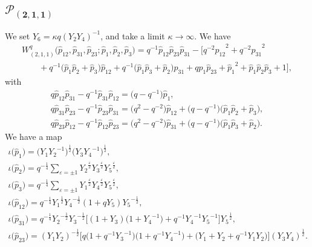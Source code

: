 \documentclass[pdftex]{sigma}
\numberwithin{equation}{section}
\begin{document}
\subsection[$\mathcal{P}_{(2,1,1)}$]{$\boldsymbol{\mathcal{P}_{(2,1,1)}}$}
We set $Y_6 = \kappa q ( Y_2 Y_4)^{-1}$, and take a limit $\kappa \to \infty$. We have
\begin{gather*}
 W^q_{(2,1,1)}\big(\hat{p}_{12}, \hat{p}_{31}, \hat{p}_{23} ; \hat{p}_1, \hat{p}_2, \hat{p}_3\big) = q^{-1} \hat{p}_{12} \hat{p}_{23} \hat{p}_{31} - \bigl[ q^{-2} {\hat{p}_{12}}^{2} + q^{-2} {\hat{p}_{31}}^{2} \\
 \qquad {} + q^{-1} \big( \hat{p}_1 \hat{p}_2 + \hat{p}_3 \big) \hat{p}_{12} + q^{-1} \big( \hat{p}_1 \hat{p}_3 + \hat{p}_2 \big) \hat{p}_{31} + q \hat{p}_1 \hat{p}_{23} + {\hat{p}_1}^{2} +
 \hat{p}_1 \hat{p}_2 \hat{p}_3 + 1 \bigr],
\end{gather*}
with
\begin{gather*}
 q \hat{p}_{12} \hat{p}_{31} -q^{-1} \hat{p}_{31} \hat{p}_{12} = \big( q - q^{-1} \big) \hat{p}_1 , \\
 q \hat{p}_{31} \hat{p}_{23} -q^{-1} \hat{p}_{23} \hat{p}_{31} = \big(q^2 - q^{-2}\big) \hat{p}_{12} + \big( q - q^{-1} \big) \big( \hat{p}_1 \hat{p}_2 + \hat{p}_3 \big), \\
 q \hat{p}_{23} \hat{p}_{12} -q^{-1} \hat{p}_{12} \hat{p}_{23} = \big( q^2 - q^{-2} \big) \hat{p}_{31} + \big( q - q^{-1} \big) \big( \hat{p}_1 \hat{p}_3 + \hat{p}_2 \big) .
\end{gather*}
We have a map
\begin{gather}
 \iota \big(\hat{p}_1\big) = \big( Y_1 {Y_2}^{-1} \big)^{\frac{1}{2}} \big( Y_3 {Y_4}^{-1} \big)^{\frac{1}{2}},\nonumber \\
 \iota\big(\hat{p}_2\big) = q^{-\frac{1}{4}} \sum_{\varepsilon=\pm 1} {Y_2}^{\frac{\varepsilon}{2}} {Y_3}^{\frac{\varepsilon}{2}} {Y_5}^{\frac{\varepsilon}{2}} ,\nonumber \\
\iota\big(\hat{p}_3\big) = q^{-\frac{1}{4}} \sum_{\varepsilon=\pm 1} {Y_1}^{\frac{\varepsilon}{2}} {Y_4}^{\frac{\varepsilon}{2}} {Y_5}^{\frac{\varepsilon}{2}} ,\nonumber \\
 \iota\big(\hat{p}_{12}\big) = q^{-\frac{1}{4}} {Y_1}^{\frac{1}{2}} {Y_4}^{-\frac{1}{2}} ( 1 + q Y_5 ) {Y_5}^{-\frac{1}{2}} ,\nonumber \\
 \iota\big(\hat{p}_{31}\big) = q^{-\frac{1}{4}} {Y_2}^{-\frac{1}{2}} {Y_3}^{-\frac{1}{2}} \big[ ( 1+Y_3) \big( 1+{Y_4}^{-1} \big) + q^{-1} {Y_4}^{-1} {Y_5}^{-1} \big] {Y_5}^{\frac{1}{2}} ,\nonumber \\
 \iota\big(\hat{p}_{23}\big) = ( Y_1 Y_2 )^{-\frac{1}{2}} \big[ q \big( 1 + q^{-1} {Y_3}^{-1} \big) \big( 1+q^{-1} {Y_4}^{-1} \big) + \big( Y_1 + Y_2 + q^{-1} Y_1 Y_2 \big) \big] ( Y_3 Y_4 )^{\frac{1}{2}} . \label{q_P211}
\end{gather}
\end{document}
